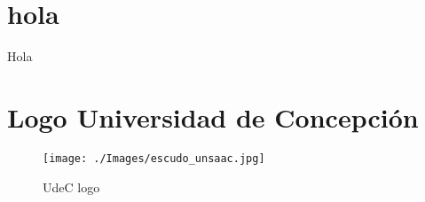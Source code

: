 \documentclass[../Main.tex]{subfiles}
\begin{document}
\renewcommand{\thesection}{A\arabic{section}}
\renewcommand{\thetable}{A\arabic{section}.\arabic{table}}




\section{hola}
Hola

\section{Logo Universidad de Concepción}
\begin{figure}[h]
    \centering
\caption{UdeC logo}
    \texttt{[image: ./Images/escudo\_unsaac.jpg]}
    \label{fig_logo2}
\end{figure}


\biblio %
\end{document}
